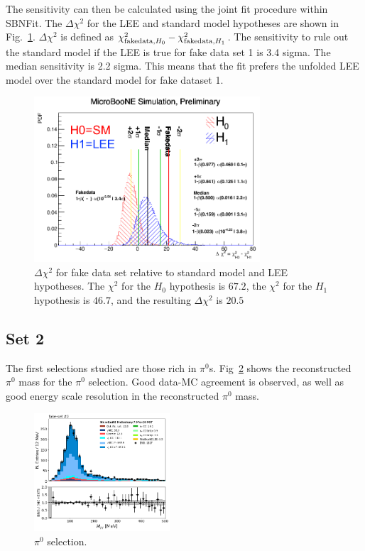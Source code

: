 The sensitivity can then be calculated using the joint fit procedure within SBNFit. The $\Delta \chi^{2}$ for the LEE and standard model hypotheses are shown in Fig.~\ref{fig:fakedata:set1:sens}.  $\Delta \chi^{2}$ is defined as $\chi^{2}_{{\rm fakedata}, H_{0}}-\chi^{2}_{{\rm fakedata}, H_{1}}$. The sensitivity to rule out the standard model if the LEE is true for fake data set 1 is 3.4 sigma.  The median sensitivity is 2.2 sigma. This means that the fit prefers the unfolded LEE model over the standard model for fake dataset 1.

\begin{figure}[H]
\begin{center}
\includegraphics[width=0.75\textwidth]{Fakedata/set1/sens.pdf}
\caption{\label{fig:fakedata:set1:sens} $\Delta \chi^{2}$ for fake data set relative to standard model and LEE hypotheses. The $\chi^{2}$ for the $H_0$ hypothesis is $67.2$, the $\chi^{2}$ for the $H_1$ hypothesis is $46.7$, and the resulting $\Delta \chi^{2}$ is $20.5$ }
\end{center}
\end{figure}


\subsection{Set 2}

The first selections studied are those rich in $\pi^{0}$s. Fig~\ref{fig:fakedata:set2:pi0} shows the reconstructed $\pi^{0}$ mass for the $\pi^{0}$ selection. Good data-MC agreement is observed, as well as good energy scale resolution in the reconstructed $\pi^{0}$ mass. 
\begin{figure}[H]
\begin{center}
\includegraphics[width=0.45\textwidth]{Fakedata/set2/pi0.pdf}
\caption{\label{fig:fakedata:set2:pi0} $\pi^{0}$ selection.}
\end{center}
\end{figure}

